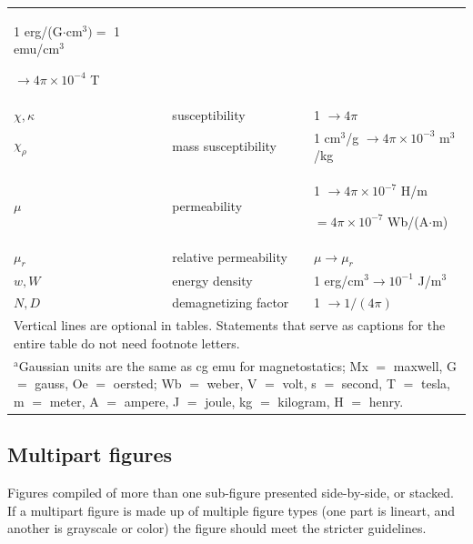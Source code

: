 \documentclass{ieeeaccess}
\begin{document}
\begin{table}
\begin{tabular}{|p{25pt}|p{75pt}|p{115pt}|}
		1 erg/(G$\cdot $cm$^{3}) =$ 1 emu/cm$^{3}$ \par $\to 4\pi \times  10^{-4}$ T    \\
		$\chi , \kappa $                               &
		susceptibility                                 &
		1 $\to  4\pi $                                                                  \\
		$\chi_{\rho }$                                 &
		mass susceptibility                            &
		1 cm$^{3}$/g $\to  4\pi \times  10^{-3}$ m$^{3}$/kg                             \\
		$\mu $                                         &
		permeability                                   &
		1 $\to  4\pi \times  10^{-7}$ H/m \par $= 4\pi \times  10^{-7}$ Wb/(A$\cdot $m) \\
		$\mu_{r}$                                      &
		relative permeability                          &
		$\mu \to \mu_{r}$                                                               \\
		$w, W$                                         &
		energy density                                 &
		1 erg/cm$^{3} \to  10^{-1}$ J/m$^{3}$                                           \\
		$N, D$                                         &
		demagnetizing factor                           &
		1 $\to  1/(4\pi )$                                                              \\
		\hline
		\multicolumn{3}{p{251pt}}{Vertical lines are optional in tables. Statements that serve as captions for
		the entire table do not need footnote letters. }                                \\
		\multicolumn{3}{p{251pt}}{$^{\mathrm{a}}$Gaussian units are the same as cg emu for magnetostatics; Mx
			$=$ maxwell, G $=$ gauss, Oe $=$ oersted; Wb $=$ weber, V $=$ volt, s $=$
			second, T $=$ tesla, m $=$ meter, A $=$ ampere, J $=$ joule, kg $=$
			kilogram, H $=$ henry.}
	\end{tabular}
	\label{tab1}
\end{table}

\subsection{Multipart figures}
Figures compiled of more than one sub-figure presented side-by-side, or
stacked. If a multipart figure is made up of multiple figure
types (one part is lineart, and another is grayscale or color) the figure
should meet the stricter guidelines.
\end{document}
